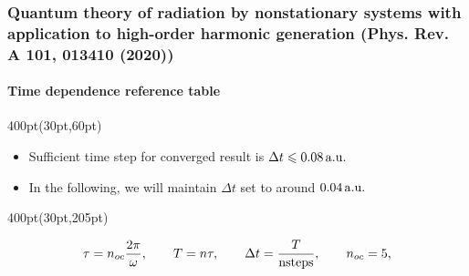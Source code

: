 \begin{frame}
\frametitle{Quantum theory of radiation by nonstationary systems 
	with application to high-order harmonic generation
        (Phys. Rev. A 101, 013410 (2020))}
	\framesubtitle{Time dependence reference table}
\small

\begin{textblock*}{400pt}(30pt,60pt)
\footnotesize
\begin{itemize}
\item Sufficient time step for converged result is 
$\Delta t \leqslant 0.08\,\rm a.u.$
\item In the following, we will maintain $\Delta t$ set to 
around $0.04\,\rm a.u.$
\end{itemize}

\end{textblock*}

{
\tiny 

}


\begin{textblock*}{400pt}(30pt,205pt)
\scriptsize

\begin{align}
    \tau = n_{oc}\frac{2\pi}{\omega}, \hspace{20pt}
    T = n \tau, \hspace{20pt}
    \Delta t  = \frac{T}{{\rm nsteps}}, \hspace{20pt}
    n_{oc}  = 5,
                \nonumber
\end{align}

\end{textblock*}

\end{frame}




